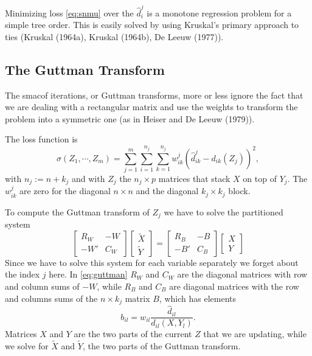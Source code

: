 \documentclass[
  12pt,
]{article}
\begin{document}
Minimizing loss \eqref{eq:snmu} over the \(\hat d_i^j\) is a monotone regression problem for a simple tree order. This is easily solved by using Kruskal's primary approach to ties (Kruskal (1964a), Kruskal (1964b), De Leeuw (1977)).

\subsection{The Guttman Transform}\label{the-guttman-transform}

The smacof iterations, or Guttman transforms, more or less ignore the fact that we are dealing with a rectangular matrix and use the weights to transform the problem into a symmetric one (as in Heiser and De Leeuw (1979)).

The loss function is
\begin{equation}
\sigma(Z_1,\cdots,Z_m)=\sum_{j=1}^m\sum_{i=1}^{n_j}\sum_{k=1}^{n_j}w_{ik}^j(\hat d_{ik}^j-d_{ik}(Z_j))^2,
\label{eq:fullloss}
\end{equation}
with \(n_j:=n+k_j\) and with \(Z_j\) the \(n_j\times p\) matrices that stack \(X\) on top of
\(Y_j\). The \(w_{ik}^j\) are zero for the diagonal \(n\times n\) and the diagonal
\(k_j\times k_j\) block.

To compute the Guttman transform of \(Z_j\) we have to solve
the partitioned system
\begin{equation}
\begin{bmatrix}
R_W&-W\\
-W'&C_W
\end{bmatrix}
\begin{bmatrix}\tilde X\\\tilde Y\end{bmatrix}=
\begin{bmatrix}
R_B&-B\\
-B'&C_B
\end{bmatrix}
\begin{bmatrix}X\\Y\end{bmatrix}
\label{eq:guttman}
\end{equation}
Since we have to solve this system for each variable separately we forget about the index \(j\) here. In
\eqref{eq:guttman} \(R_W\) and \(C_W\) are the diagonal matrices with row and column sums of \(-W\), while \(R_B\) and \(C_B\) are diagonal matrices with the row and columns sums of the \(n\times k_j\) matrix \(B\), which has elements
\begin{equation}
b_{il}=w_{il}\frac{\hat d_{il}}{d_{il}(X,Y_l)}.
\label{eq:bdef}
\end{equation}
Matrices \(X\) and \(Y\) are the two parts of the current \(Z\) that we are updating,
while we solve for \(\tilde X\) and \(\tilde Y\), the two parts of the Guttman
transform.
\end{document}
